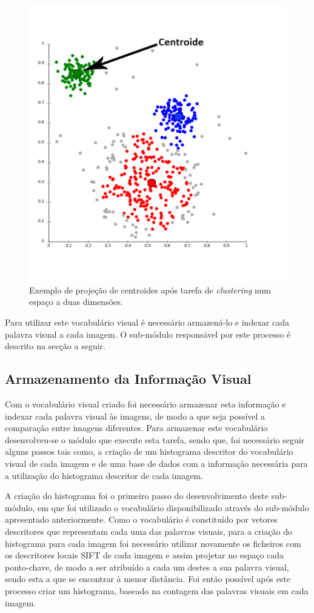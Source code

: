 
\begin{figure}
\centering
\includegraphics[width=0.6\linewidth]{./figures/centroides}
\caption{Exemplo de projeção de centroides após tarefa de \textit{clustering} num espaço a duas dimensões.}
\label{fig:centroides}
\end{figure}

Para utilizar este vocabulário visual é necessário armazená-lo e indexar cada palavra visual a cada imagem. O sub-módulo responsável por este processo é descrito na secção a seguir.

\subsection{Armazenamento da Informação Visual}

Com o vocabulário visual criado foi necessário armazenar esta informação e indexar cada palavra visual às imagens, de modo a que seja possível a comparação entre imagens diferentes. Para armazenar este vocabulário desenvolveu-se o módulo que execute esta tarefa, sendo que, foi necessário seguir alguns passos tais como, a criação de um histograma descritor do vocabulário visual de cada imagem e de uma base de dados com a informação necessária para a utilização do histograma descritor de cada imagem.

A criação do histograma foi o primeiro passo do desenvolvimento deste sub-módulo, em que foi utilizado o vocabulário disponibilizado através do sub-módulo apresentado anteriormente. Como o vocabulário é constituído por vetores descritores que representam cada uma das palavras visuais, para a criação do histograma para cada imagem foi necessário utilizar novamente os ficheiros com os descritores locais SIFT de cada imagem e assim projetar no espaço cada ponto-chave, de modo a ser atribuído a cada um destes a sua palavra visual, sendo esta a que se encontrar à menor distância. Foi então possível após este processo criar um histograma, baseado na contagem das palavras visuais em cada imagem.

